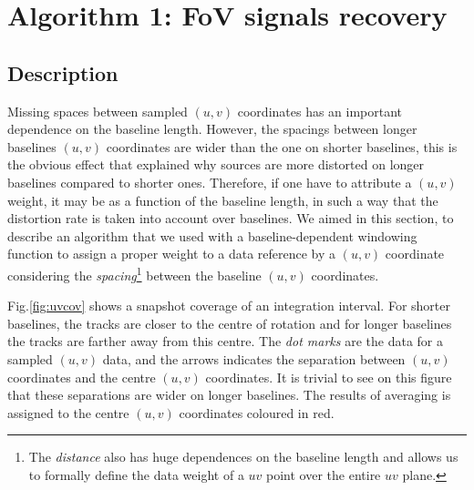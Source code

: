 \documentclass[useAMS,usenatbib]{mn2e}
\begin{document}
\section{Algorithm 1: FoV signals recovery}
\label{baseline1}
\subsection{Description}
Missing spaces between sampled $(u,v)$ coordinates has an important dependence on the baseline length. However, the spacings between longer 
baselines $(u,v)$ coordinates are wider than the one on shorter baselines, this is the obvious effect that explained why sources are more 
distorted on longer baselines compared to shorter ones. Therefore, if one have to attribute a $(u,v)$ weight, it may be as a function of 
the baseline length, in such a way that the distortion rate is taken into account over baselines. We aimed in this section, to 
describe an algorithm that we used with a baseline-dependent windowing function to assign a proper weight to a data reference by a $(u,v)$ 
coordinate considering the \textit{spacing}\footnote{The \textit{distance} also has huge 
dependences on the baseline length and allows us to formally define the data
weight of a $uv$ point over the entire $uv$ plane.} between the baseline $(u,v)$ coordinates.

Fig.\ref{fig:uvcov} shows a snapshot coverage of an integration interval. For shorter baselines, the tracks are closer to the centre of 
rotation and for longer baselines the tracks are farther away from this centre. The \textit{dot marks} are the data for a sampled $(u,v)$ 
data, and the  arrows indicates the separation between $(u,v)$ coordinates and the centre $(u,v)$ coordinates. It is trivial to see on this 
figure that these separations are wider on longer baselines. The results of averaging is assigned to the centre $(u,v)$ coordinates 
coloured 
in red. 
\end{document}
